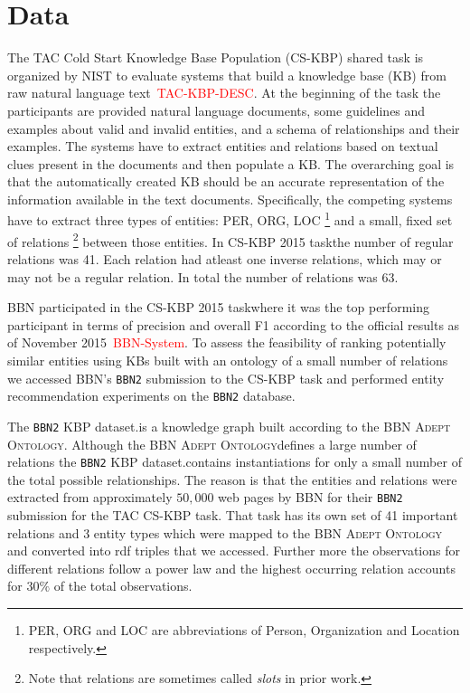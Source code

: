 \documentclass[paper=a4,fontsize=11pt]{scrartcl}
\numberwithin{equation}{section}    %
\numberwithin{figure}{section}      %
\numberwithin{table}{section}       %
\renewcommand{\cite}[1]{\textcolor{red}{#1}}
\newcommand{\dataset}[0]{\texttt{BBN2} KBP dataset.}
\newcommand{\ontology}{\textsc{BBN Adept Ontology}}
\newcommand{\task}{CS-KBP 2015 task}
\begin{document}
\section{Data}
\label{sec:data}
The TAC Cold Start Knowledge Base Population (CS-KBP) shared task is organized
by NIST to evaluate systems that build a knowledge base (KB) from raw natural
language text~\cite{TAC-KBP-DESC}.  At the beginning of the task the
participants are provided natural language documents, some guidelines and
examples about valid and invalid entities, and a schema of relationships and
their examples.  The systems have to extract entities and relations based on
textual clues present in the documents and then populate a KB. The overarching
goal is that the automatically created KB should be an accurate representation
of the information available in the text documents. Specifically, the competing
systems have to extract three types of entities: \textsc{PER, ORG, LOC}
\footnote{PER, ORG and LOC are abbreviations of Person, Organization
  and Location respectively.}
and a small, fixed set of relations
\footnote{Note that relations are sometimes called \textit{slots} in prior
work.}
between those entities. In \task the number of regular relations was 41. Each
relation had atleast one inverse relations, which may or may not be a regular
relation.  In total the number of relations was 63.

BBN participated in the \task where it was the top performing
participant in terms of precision and overall F1 according to the official
results as of November 2015~\cite{BBN-System}. To assess the feasibility of
ranking potentially similar entities using KBs built with an ontology of a small
number of relations we accessed BBN's \texttt{BBN2} submission to the CS-KBP
task and performed entity recommendation experiments on the \texttt{BBN2}
database.

The \dataset is a knowledge graph built according to the \ontology.
Although the \ontology defines a large number of
relations the \dataset contains instantiations for only a small
number of the total possible relationships.
The reason is that the entities and relations
were extracted from approximately $50,000$ web pages by BBN for their
\texttt{BBN2} submission for the TAC CS-KBP task. That task has its own set
of 41 important relations and 3 entity types which were mapped to the \ontology
and converted into rdf triples that we accessed.
Further more the observations for different relations follow a power law
and the highest occurring relation accounts for $30\%$ of the total
observations.
\end{document}
